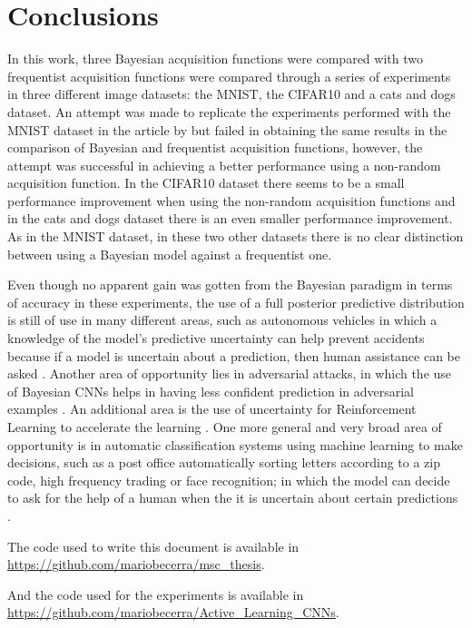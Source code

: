 
\chapter{Conclusions}
\label{ch:conclusions}


In this work, three Bayesian acquisition functions were compared with two frequentist acquisition functions were compared through a series of experiments in three different image datasets: the MNIST, the CIFAR10 and a cats and dogs dataset. An attempt was made to replicate the experiments performed with the MNIST dataset in the article  by \citeauthor{Gal2016Active} but failed in obtaining the same results in the comparison of Bayesian and frequentist acquisition functions, however, the attempt was successful in achieving a better performance using a non-random acquisition function. In the CIFAR10 dataset there seems to be a small performance improvement when using the non-random acquisition functions and in the cats and dogs dataset there is an even smaller performance improvement. As in the MNIST dataset, in these two other datasets there is no clear distinction between using a Bayesian model against a frequentist one.

Even though no apparent gain was gotten from the Bayesian paradigm in terms of accuracy in these experiments, the use of a full posterior predictive distribution is still of use in many different areas, such as autonomous vehicles in which a knowledge of the model's predictive uncertainty can help prevent accidents because if a model is uncertain about a prediction, then human assistance can be asked \cite{gal2016uncertainty} \cite{kendall2017uncertainties} \cite{michelmore2018evaluating}. Another area of opportunity lies in adversarial attacks, in which the use of Bayesian CNNs helps in having less confident prediction in adversarial examples \cite{li2017dropout} \cite{rawat2017adversarial} \cite{smith2018understanding}. An additional area is the use of uncertainty for Reinforcement Learning to accelerate the learning \cite{gal2016uncertainty}. One more general and very broad area of opportunity is in automatic classification systems using machine learning to make decisions, such as a post office automatically sorting letters according to a zip code, high frequency trading or face recognition; in which the model can decide to ask for the help of a human when the it is uncertain about certain predictions \cite{gal2016uncertainty}.

The code used to write this document is available in \url{https://github.com/mariobecerra/msc_thesis}.

And the code used for the experiments is available in \url{https://github.com/mariobecerra/Active_Learning_CNNs}.

